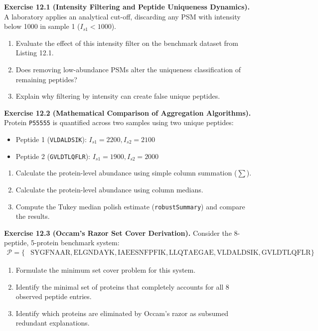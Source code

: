 \documentclass[11pt,twoside,openright]{book}
\begin{document}
\noindent\textbf{Exercise 12.1 (Intensity Filtering and Peptide Uniqueness Dynamics).}\enspace
\label{ex:intensity_uniqueness}
A laboratory applies an analytical cut-off, discarding any PSM with intensity below 1000 in sample 1 ($I_{s1} < 1000$).
\begin{enumerate}
    \item Evaluate the effect of this intensity filter on the benchmark dataset from Listing 12.1.
    \item Does removing low-abundance PSMs alter the uniqueness classification of remaining peptides?
    \item Explain why filtering by intensity can create false unique peptides.
\end{enumerate}

\vspace{0.8em}
\noindent\textbf{Exercise 12.2 (Mathematical Comparison of Aggregation Algorithms).}\enspace
\label{ex:aggregation_algorithms}
Protein \texttt{P55555} is quantified across two samples using two unique peptides:
\begin{itemize}
    \item Peptide 1 (\texttt{VLDALDSIK}): $I_{s1} = 2200, I_{s2} = 2100$
    \item Peptide 2 (\texttt{GVLDTLQFLR}): $I_{s1} = 1900, I_{s2} = 2000$
\end{itemize}
\begin{enumerate}
    \item Calculate the protein-level abundance using simple column summation ($\sum$).
    \item Calculate the protein-level abundance using column medians.
    \item Compute the Tukey median polish estimate (\texttt{robustSummary}) and compare the results.
\end{enumerate}

\vspace{0.8em}
\noindent\textbf{Exercise 12.3 (Occam's Razor Set Cover Derivation).}\enspace
\label{ex:occam_set_cover}
Consider the 8-peptide, 5-protein benchmark system:
\begin{align*}
\mathcal{P} = \{&\text{SYGFNAAR}, \text{ELGNDAYK}, \text{IAEESNFPFIK}, \text{LLQTAEGAE}, \text{VLDALDSIK}, \text{GVLDTLQFLR}\}
\end{align*}
\begin{enumerate}
    \item Formulate the minimum set cover problem for this system.
    \item Identify the minimal set of proteins that completely accounts for all 8 observed peptide entries.
    \item Identify which proteins are eliminated by Occam's razor as subsumed redundant explanations.
\end{enumerate}
\end{document}
